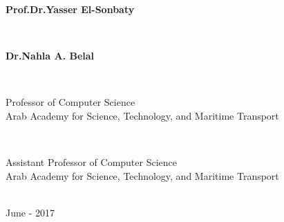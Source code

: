 \documentclass[12pt,openany]{llncs}
\begin{document}
\begin{titlepage}
{\begin{minipage}{0.55\textwidth}
{\large \bfseries Prof.Dr.Yasser El-Sonbaty}
\end{minipage}
~
\begin{minipage}{0.40\textwidth}
{\large \bfseries Dr.Nahla A. Belal}
\end{minipage}\\[0.2cm]

\begin{minipage}{0.47\textwidth}
\begin{flushleft}
\center
{\small Professor of Computer Science}\\
{\small Arab Academy for Science, Technology, and Maritime Transport}
\end{flushleft}
\end{minipage}
~
\begin{minipage}{0.47\textwidth}
\begin{flushright}
\center
{\small Assistant Professor of Computer Science}\\
{\small Arab Academy for Science, Technology, and Maritime Transport}
\end{flushright}
\end{minipage}\\[0.2cm]
{\small June - 2017}\\[0cm] 
\vfill %
}
\clearpage\thispagestyle{empty}


\end{titlepage}
\end{document}
